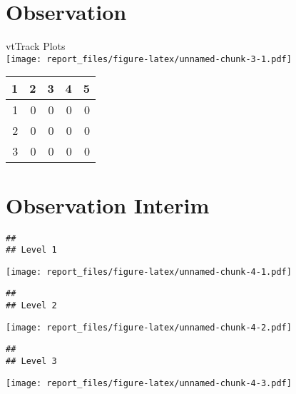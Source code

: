 \documentclass[]{article}
\begin{document}
\clearpage

\hypertarget{observation}{%
\section{Observation}\label{observation}}

vtTrack Plots\\
\texttt{[image: report\_files/figure-latex/unnamed-chunk-3-1.pdf]}

\begin{table}[ht]
\centering
\begin{tabular}{rrrrr}
  \hline
1 & 2 & 3 & 4 & 5 \\ 
  \hline
1 & 0 & 0 & 0 & 0 \\ 
  2 & 0 & 0 & 0 & 0 \\ 
  3 & 0 & 0 & 0 & 0 \\ 
   \hline
\end{tabular}
\end{table}

\clearpage

\hypertarget{observation-interim}{%
\section{Observation Interim}\label{observation-interim}}

\begin{verbatim}
## 
## Level 1
\end{verbatim}

\texttt{[image: report\_files/figure-latex/unnamed-chunk-4-1.pdf]}

\begin{verbatim}
## 
## Level 2
\end{verbatim}

\texttt{[image: report\_files/figure-latex/unnamed-chunk-4-2.pdf]}

\begin{verbatim}
## 
## Level 3
\end{verbatim}

\texttt{[image: report\_files/figure-latex/unnamed-chunk-4-3.pdf]}
\end{document}
